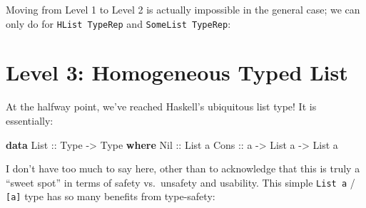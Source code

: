 \documentclass[]{article}
\newenvironment{Shaded}{}{}
\newcommand{\CommentTok}[1]{\textcolor[rgb]{0.38,0.63,0.69}{\textit{#1}}}
\newcommand{\DataTypeTok}[1]{\textcolor[rgb]{0.56,0.13,0.00}{#1}}
\newcommand{\KeywordTok}[1]{\textcolor[rgb]{0.00,0.44,0.13}{\textbf{#1}}}
\newcommand{\NormalTok}[1]{#1}
\newcommand{\OperatorTok}[1]{\textcolor[rgb]{0.40,0.40,0.40}{#1}}
\newcommand{\OtherTok}[1]{\textcolor[rgb]{0.00,0.44,0.13}{#1}}
\begin{document}
Moving from Level 1 to Level 2 is actually impossible in the general case; we
can only do for \texttt{HList\ TypeRep} and \texttt{SomeList\ TypeRep}:

\begin{Shaded}
\end{Shaded}

\hypertarget{level-3-homogeneous-typed-list}{%
\section{Level 3: Homogeneous Typed List}\label{level-3-homogeneous-typed-list}}

At the halfway point, we've reached Haskell's ubiquitous list type! It is
essentially:

\begin{Shaded}
\begin{Highlighting}[]
\KeywordTok{data} \DataTypeTok{List}\OtherTok{ ::} \DataTypeTok{Type} \OtherTok{{-}>} \DataTypeTok{Type} \KeywordTok{where}
    \DataTypeTok{Nil}\OtherTok{  ::} \DataTypeTok{List}\NormalTok{ a}
    \DataTypeTok{Cons}\OtherTok{ ::}\NormalTok{ a }\OtherTok{{-}>} \DataTypeTok{List}\NormalTok{ a }\OtherTok{{-}>} \DataTypeTok{List}\NormalTok{ a}
\end{Highlighting}
\end{Shaded}

I don't have too much to say here, other than to acknowledge that this is truly
a ``sweet spot'' in terms of safety vs.~unsafety and usability. This simple
\texttt{List\ a} / \texttt{{[}a{]}} type has so many benefits from type-safety:
\end{document}
